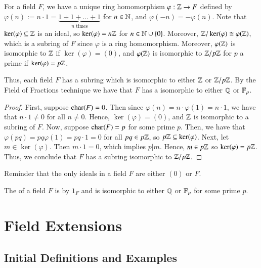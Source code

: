 \documentclass[12pt, a4paper, oneside, openright, titlepage]{book}
\begin{document}
\begin{rmk}
    For a field $F$, we have a unique ring homomorphism $\varphi:\mathbb Z\rightarrow F$ defined by $\varphi(n) := n\cdot 1 = \underbrace{1+1+...+1}_{\text{$n$ times}}$ for $n \in \mathbb N$, and $\varphi(-n) = -\varphi(n)$. Note that $\ker(\varphi) \subseteq \mathbb Z$ is an ideal, so $\ker(\varphi) = n\mathbb Z$ for $n \in \mathbb N\cup \{0\}$. Moreover, $\mathbb Z/\ker(\varphi) \cong \varphi(\mathbb Z)$, which is a subring of $F$ since $\varphi$ is a ring homomorphism. Moreover, $\varphi(\mathbb Z)$ is isomorphic to $\mathbb Z$ if $\ker(\varphi) = (0)$, and $\varphi(\mathbb Z)$ is isomorphic to $\mathbb Z/p\mathbb Z$ for $p$ a prime if $\ker(\varphi) = p\mathbb Z$. 

    Thus, each field $F$ has a subring which is isomorphic to either $\mathbb Z$ or $\mathbb Z/p\mathbb Z$. By the Field of Fractions technique we have that $F$ has a  isomorphic to either $\mathbb Q$ or $\mathbb F_p$.
\end{rmk}
\begin{proof}
    First, suppose $\operatorname{char}(F) = 0$. Then since $\varphi(n) = n\cdot \varphi(1) = n\cdot 1$, we have that $n\cdot 1 \neq 0$ for all $n \neq 0$. Hence, $\ker(\varphi) = (0)$, and $\mathbb Z$ is isomorphic to a subring of $F$. Now, suppose $\operatorname{char}(F) = p$ for some prime $p$. Then, we have that $\varphi(pq) = pq\varphi(1) = pq\cdot1 = 0$ for all $pq \in p\mathbb Z$, so $p\mathbb Z \subseteq \ker(\varphi)$. Next, let $m \in \ker(\varphi)$. Then $m\cdot 1 = 0$, which implies $p\vert m$. Hence, $m \in p\mathbb Z$ so $\ker(\varphi) = p\mathbb Z$. Thus, we conclude that $F$ has a subring isomorphic to $\mathbb Z/p\mathbb Z$.
\end{proof}


\begin{rec}
    Reminder that the only ideals in a field $F$ are either $(0)$ or $F$.
\end{rec}


\begin{defn}
    The  of a field $F$ is  by $1_F$ and is isomorphic to either $\mathbb Q$ or $\mathbb F_p$ for some prime $p$.
\end{defn}




\chapter{\textsection\textsection Field Extensions}

\section{\textsection Initial Definitions and Examples}
\end{document}

